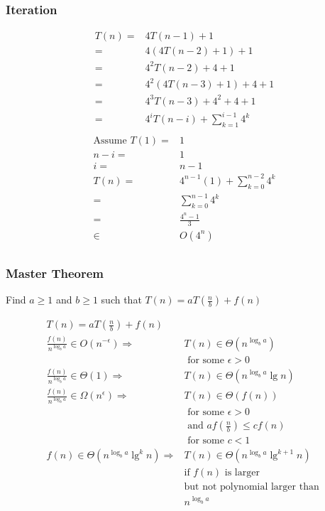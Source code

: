 \documentclass[10pt, a4paper,landscape]{article}
\begin{document}
\begin{multicols*}{4}
\subsubsection{Iteration}
\begin{align*}
T(n) =& 4T(n - 1) + 1\\
     =& 4(4T(n - 2) + 1) + 1\\
     =& 4^2T(n - 2) + 4 + 1\\
     =& 4^2(4T(n - 3) + 1) + 4 + 1\\
     =& 4^3T(n - 3) + 4^2 + 4 + 1\\
     =& 4^iT(n - i) + \sum_{k =1}^{i - 1} 4^k\\
\end{align*}
\begin{align*}
\text{Assume } T(1) =& 1\\
n - i =& 1\\
    i =& n - 1\\
T(n) =& 4^{n - 1}(1) + \sum_{k = 0}^{n -2} 4^k\\
     =& \sum_{k = 0}^{n - 1} 4^k\\
     =& \frac{4^n - 1}{3}\\
    \in& O(4^n)\\
\end{align*}

\subsubsection{Master Theorem}
\begin{compactitem}
    \item[Find] $a \geq 1$ and $b \geq 1$ such that $T(n) = a T\left(\frac n b\right) + f(n)$
\end{compactitem}
\begin{align*}
    T(n) = a T\left(\frac n b\right) + f(n) \\
    \frac{f(n)}{n^{\log_b a}} \in O(n^{-\epsilon})  \Rightarrow& T(n) \in \Theta(n^{\log_b a})\\ &\text{ for some } \epsilon > 0 \\
    \frac{f(n)}{n^{\log_b a}} \in \Theta(1) \Rightarrow& T(n) \in \Theta(n^{\log_b a} \lg n) \\
    \frac{f(n)}{n^{\log_b a}} \in \Omega(n^{\epsilon}) \Rightarrow& T(n) \in \Theta(f(n))\\ &\text{ for some } \epsilon > 0 \\&\text{ and } af(\frac{n}{b}) \leq cf(n)\\ &\text{ for some } c < 1 \\
    f(n) \in \Theta(n^{\log_b a} \lg^{k} n) \Rightarrow& T(n) \in \Theta(n^{\log_b a} \lg^{k + 1} n)\\ &\text{if } f(n) \text{ is larger}\\ &\text{but not polynomial larger than }\\ &n^{\log_b a}\\
\end{align*}


\end{multicols*}
\end{document}
